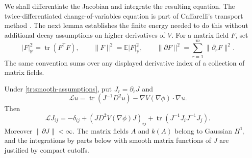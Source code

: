 We shall differentiate the Jacobian and integrate the resulting equation.
The twice-differentiated change-of-variables equation is part of
Caffarelli's transport method \cite[Section~5]{Caffarelli2000}.
The next lemma establishes the finite energy needed to do this without
additional decay assumptions on higher derivatives of $V$.
For a matrix field $F$, set
\[
 |F|_{\mathrm F}^2=\operatorname{tr}(F^{\mathsf T}F),\qquad
 \|F\|^2=\mathbb E|F|_{\mathrm F}^2,\qquad
 \|\partial F\|^2=\sum_{r=1}^m\|\partial_rF\|^2.
\]
The same convention sums over any displayed derivative index of a
collection of matrix fields.

\begin{lemma}\label{tr:energy}
Under \eqref{tr:smooth-assumptions}, put $J_r=\partial_rJ$ and
\[
 \mathcal L u=\operatorname{tr}(J^{-1}D^2u)
             -\nabla V(\nabla\phi)\cdot\nabla u.
\]
Then
\begin{equation}\label{tr:Jacobian-equation}
 \mathcal L J_{ij}
 =-\delta_{ij}+(JD^2V(\nabla\phi)J)_{ij}
   +\operatorname{tr}(J^{-1}J_iJ^{-1}J_j).
\end{equation}
Moreover $\|\partial J\|<\infty$.  The matrix fields $A$ and $k(A)$
belong to Gaussian $H^1$, and the integrations by parts below with
smooth matrix functions of $J$ are justified by compact cutoffs.
\end{lemma}
